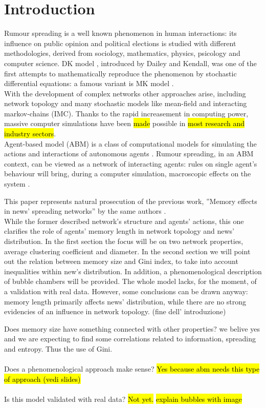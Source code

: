 \section{Introduction}
Rumour spreading is a well known phenomenon in human interactions:
its influence on public opinion \cite{publicoprumsp} and political elections \cite{politicalrumsp} is studied
with different methodologies, derived from sociology, mathematics,
physics, psicology and computer science.
DK model \cite{DKmodel}, introduced by Dailey and Kendall, was one of
the first attempts to mathematically reproduce the phenomenon by
stochastic differential equations: a famous variant is MK model \cite{MKmodel}.\\
With the development of complex networks other approaches arise,
including network topology and many stochastic models
like mean-field \cite{meanfield} and interacting markov-chains \cite{IMC} (IMC).
Thanks to the rapid increasement in computing power,
massive computer simulations have been \hl{made} possible in
\hl{most research and industry sectors}.\\
Agent-based model (ABM) is a class of computational models for
simulating the actions and interactions of autonomous agents \cite{Agentbased}.
Rumour spreading, in an ABM context, can be viewed as a network
of interacting agents: rules on single agent's behaviour
will bring, during a computer simulation, macroscopic
effects on the system \cite{Agentbased}.

This paper represents natural prosecution of the previous work,
''Memory effects in news' spreading networks'' by the same authors \cite{ourpaper}.\\
While the former described network's structure and agents' actions, this one clarifies 
the role of agents' memory length in network topology and news' distribution.
In the first section the focus will be on two network properties, average clustering coefficient and diameter.
In the second section we will point out the relation between memory size
and Gini index, to take into account inequalities within new's distribution.
In addition, a phenomenological description of bubble chambers will be provided.
The whole model lacks, for the moment, of a validation with real data.
However, some conclusions can be drawn anyway: memory length primarily affects 
news' distribution, while there are no strong evidencies of an influence in network topology.
(fine dell' introduzione)


Does memory size have something connected with other properties?
we belive yes and we are expecting to find some correlations related
to information, spreading and entropy. Thus the use of Gini.\\ \\
Does a phenomenological approach make sense? \hl{Yes because abm needs
this type of approach (vedi slides)}\\ \\
Is this model validated with real data? \hl{Not yet.}
\hl{explain bubbles with image}